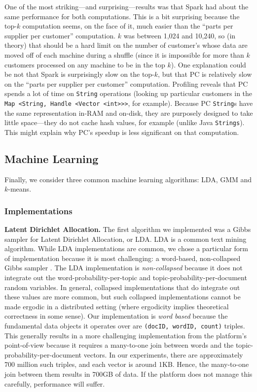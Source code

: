 One of the most striking---and surprising---results was that Spark had about the same performance for both computations.  This is
a bit surprising because the top-$k$ computation seems, on the face of it, much easier 
than the ``parts per supplier per customer'' computation.  $k$ was between 1,024 and 10,240, so (in theory) that should be
a hard limit on the number of customer's whose data are moved off of each machine during a shuffle 
(since it is impossible for more than $k$
customers processed on any machine to be in the top $k$).  One explanation could be not that Spark is surprisingly slow on the
top-$k$, but that PC is relatively slow on the ``parts per supplier per customer'' computation.  Profiling reveals that PC spends
a lot of time on \texttt{String} operations (looking up particular customers in the
\texttt{Map <String, Handle <Vector <int>>>}, for example).  
Because PC \texttt{String}s have the same representation in-RAM and on-disk, they are purposely designed to take little
space---they do not cache hash values, for example (unlike Java \texttt{Strings}).  This might explain why PC's speedup is
less significant on that computation.

\subsection {Machine Learning}

Finally, we consider three common machine learning algorithms: LDA,
GMM and $k$-means. 

\subsubsection {Implementations}

\noindent
\textbf{Latent Dirichlet Allocation.}
The first algorithm we implemented was a Gibbs sampler for
Latent Dirichlet Allocation, or LDA.  LDA is a common text mining algorithm.
While LDA implementations are common, we
chose a particular form of implementation because it is most challenging:
a 
word-based,
non-collapsed Gibbs sampler \cite{jermaineExperimental}.  The LDA implementation
is \emph{non-collapsed} because it does not integrate out the word-probability-per-topic
and topic-probability-per-document random variables. In general, collapsed implementations
that do integrate out these values are more common, but such collapsed implementations
cannot be made ergodic in a distributed setting
(where ergodicity implies theoretical correctness in some sense).
Our implementation is
\emph{word based} because the fundamental data objects it operates over are \texttt{(docID, wordID, count)} 
triples.  This generally results in a more challenging
implementation from the platform's point-of-view because it requires a many-to-one join between words
and the topic-probability-per-document vectors.  In our experiments, there are approximately
700 million such triples, and each vector is around 1KB.  Hence, the many-to-one join between them results in
700GB of data.  If the platform does not manage this carefully, performance will suffer.

